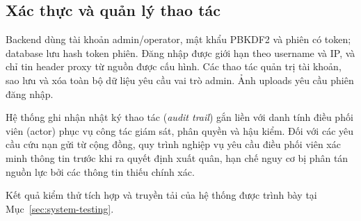 \subsection{Xác thực và quản lý thao tác}
Backend dùng tài khoản admin/operator, mật khẩu PBKDF2 và phiên có token; database lưu hash token phiên. Đăng nhập được giới hạn theo username và IP, và chỉ tin header proxy từ nguồn được cấu hình. Các thao tác quản trị tài khoản, sao lưu và xóa toàn bộ dữ liệu yêu cầu vai trò admin. Ảnh uploads yêu cầu phiên đăng nhập.

Hệ thống ghi nhận nhật ký thao tác (\emph{audit trail}) gắn liền với danh tính điều phối viên (actor) phục vụ công tác giám sát, phân quyền và hậu kiểm. Đối với các yêu cầu cứu nạn gửi từ cộng đồng, quy trình nghiệp vụ yêu cầu điều phối viên xác minh thông tin trước khi ra quyết định xuất quân, hạn chế nguy cơ bị phân tán nguồn lực bởi các thông tin thiếu chính xác.

Kết quả kiểm thử tích hợp và truyền tải của hệ thống được trình bày tại Mục~\ref{sec:system-testing}.

